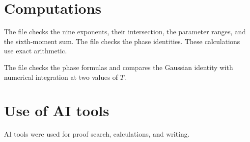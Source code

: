 \documentclass[11pt]{amsart}
\theoremstyle{definition}
\theoremstyle{remark}
\numberwithin{equation}{section}
\begin{document}
\appendix


\section{Computations}\label{app:check}
The file  checks the nine exponents,
their intersection, the parameter ranges, and the sixth-moment sum.
The file  checks the phase identities.
These calculations use exact arithmetic.

The file  checks the phase formulas
and compares the Gaussian identity with numerical integration at two
values of $T$.

\section*{Use of AI tools}
AI tools were used for proof search, calculations, and writing.
\end{document}
